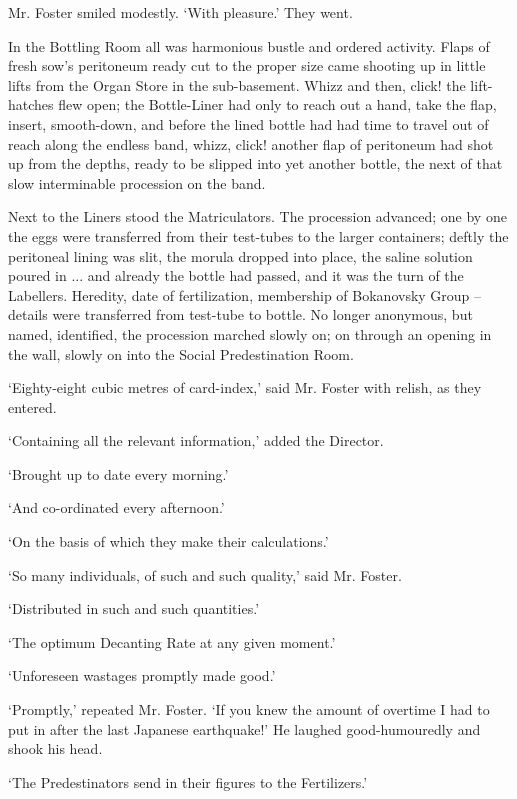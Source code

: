 \documentclass[12pt,a5paper]{book}
\newcommand{\sqm}[1]{‘#1’}
\begin{document}
Mr. Foster smiled modestly. \sqm{With pleasure.} They went.

In the Bottling Room all was harmonious bustle and ordered activity. Flaps of fresh sow's peritoneum ready cut to the proper size came shooting up in little lifts from the Organ Store in the sub-basement. Whizz and then, click! the lift-hatches flew open; the Bottle-Liner had only to reach out a hand, take the flap, insert, smooth-down, and before the lined bottle had had time to travel out of reach along the endless band, whizz, click! another flap of peritoneum had shot up from the depths, ready to be slipped into yet another bottle, the next of that slow interminable procession on the band.

Next to the Liners stood the Matriculators. The procession advanced; one by one the eggs were transferred from their test-tubes to the larger containers; deftly the peritoneal lining was slit, the morula dropped into place, the saline solution poured in ... and already the bottle had passed, and it was the turn of the Labellers. Heredity, date of fertilization, membership of Bokanovsky Group – details were transferred from test-tube to bottle. No longer anonymous, but named, identified, the procession marched slowly on; on through an opening in the wall, slowly on into the Social Predestination Room.

\sqm{Eighty-eight cubic metres of card-index,} said Mr. Foster with relish, as they entered.

\sqm{Containing all the relevant information,} added the Director.

\sqm{Brought up to date every morning.}

\sqm{And co-ordinated every afternoon.}

\sqm{On the basis of which they make their calculations.}

\sqm{So many individuals, of such and such quality,} said Mr. Foster.

\sqm{Distributed in such and such quantities.}

\sqm{The optimum Decanting Rate at any given moment.}

\sqm{Unforeseen wastages promptly made good.}

\sqm{Promptly,} repeated Mr. Foster. \sqm{If you knew the amount of overtime I had to put in after the last Japanese earthquake!} He laughed good-humouredly and shook his head.

\sqm{The Predestinators send in their figures to the Fertilizers.}
\end{document}
